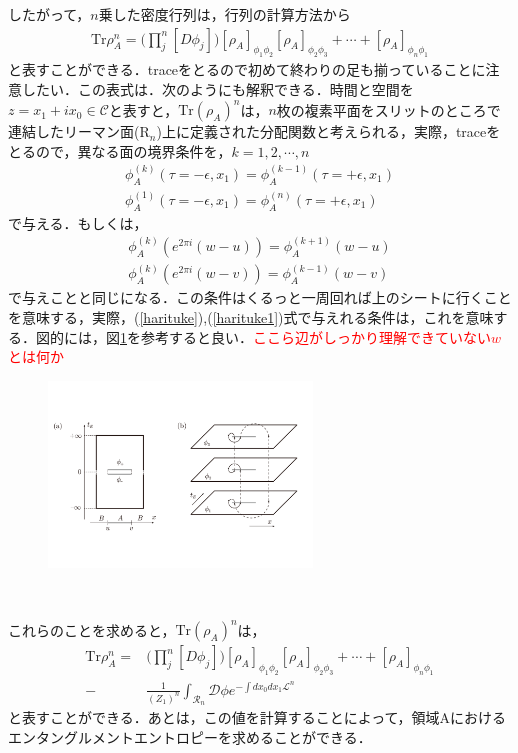 したがって，$n$乗した密度行列は，行列の計算方法から
\begin{align}
  \mathrm{Tr}\rho_{A}^{n}=\biggl(\prod^{n}_{j}[D\phi_{j}]\biggr)[\rho_{A}]_{\phi_1\phi_2}[\rho_{A}]_{\phi_2\phi_3}+\cdots+[\rho_{A}]_{\phi_n\phi_1}
\end{align}
と表すことができる．traceをとるので初めて終わりの足も揃っていることに注意したい．この表式は．次のようにも解釈できる．時間と空間を$z=x_1+ix_0 \in \mathcal{C}$と表すと，$\mathrm{Tr}(\rho_A)^n$は，$n$枚の複素平面をスリットのところで連結したリーマン面($\mathrm{R}_n$)上に定義された分配関数と考えられる，実際，traceをとるので，異なる面の境界条件を，$k=1,2,\cdots,n$
\begin{align}
  \label{harituke}
  \phi_{A}^{(k)}(\tau=-\epsilon,x_1)=\phi_{A}^{(k-1)}(\tau=+\epsilon,x_1)\\
  \label{harituke1}
  \phi_{A}^{(1)}(\tau=-\epsilon,x_1)=\phi_{A}^{(n)}(\tau=+\epsilon,x_1)
\end{align}
で与える．もしくは，
\begin{align}
  \phi_{A}^{(k)}(e^{2\pi i}(w-u))=\phi_{A}^{(k+1)}(w-u)\\
  \phi_{A}^{(k)}(e^{2\pi i}(w-v))=\phi_{A}^{(k-1)}(w-v)
\end{align}
で与えことと同じになる．この条件はくるっと一周回れば上のシートに行くことを意味する，実際，(\ref{harituke}),(\ref{harituke1})式で与えれる条件は，これを意味する．図的には，図\ref{replica00}を参考すると良い．\textcolor{red}{ここら辺がしっかり理解できていない$w$とは何か}
\begin{figure}[H]
\begin{center}
  \includegraphics[width=7cm,angle=270]{replica.pdf}
  　　　\caption{}
  　　\label{replica00}
\end{center}
\end{figure}

これらのことを求めると，$\mathrm{Tr}(\rho_A)^n$は，
\begin{align}
  \mathrm{Tr}\rho_{A}^{n}=&\biggl(\prod^{n}_{j}[D\phi_{j}]\biggr)[\rho_{A}]_{\phi_1\phi_2}[\rho_{A}]_{\phi_2\phi_3}+\cdots+[\rho_{A}]_{\phi_n\phi_1}\\
  -&\frac{1}{(Z_1)^n}\int_{\mathcal{R}_n}\mathcal{D}\phi e^{-\int dx_0dx_1\mathcal{L}^{n}}
\end{align}
と表すことができる．あとは，この値を計算することによって，領域Aにおけるエンタングルメントエントロピーを求めることができる．
\hrulefill

